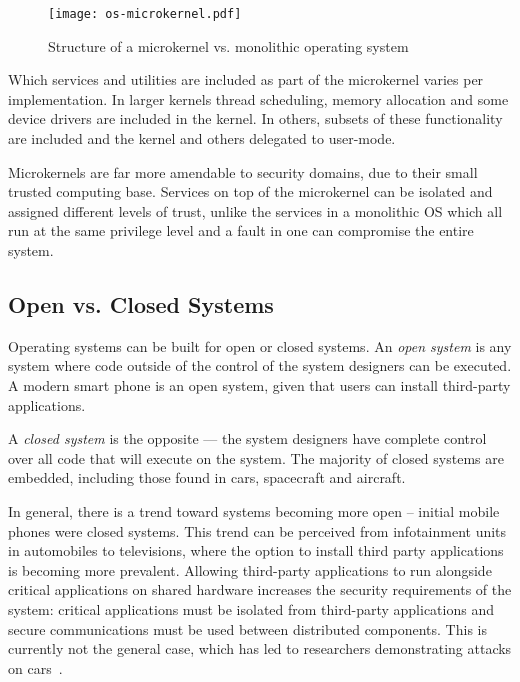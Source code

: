 \begin{figure}[tb]
	\begin{center}
		\leavevmode
		\texttt{[image: os-microkernel.pdf]}
		\caption{Structure of a microkernel vs. monolithic operating system}
		\label{fig:os-microkernel}
	\end{center}
\end{figure}

Which services and utilities are included as part of the microkernel varies per implementation. In
larger kernels thread scheduling, memory allocation and some device drivers are included in the kernel.
In others, subsets of these functionality are included and the kernel and others delegated to
user-mode. 

Microkernels are far more amendable to security domains, due to their small trusted computing base.
Services on top of the microkernel can be isolated and assigned different levels of trust, unlike
the services in a monolithic \gls{OS} which all run at the same privilege level and a fault in one
can compromise the entire system. 

\subsection{Open vs. Closed Systems}

Operating systems can be built for open or closed systems.
An \emph{open system} is any system where code outside of the control of the system designers can be executed.
A modern smart phone is an open system, given that users can install third-party applications.

A \emph{closed system} is the opposite --- the system designers have complete control over all code that will execute on the system.
The majority of closed systems are embedded, including those found in cars, spacecraft and aircraft.

In general, there is a trend toward systems becoming more open -- initial mobile phones were closed systems.
This trend can be perceived from infotainment units in automobiles to televisions, where the option to install third party applications is becoming more prevalent.
Allowing third-party applications to run alongside critical applications on shared hardware increases the security requirements of the system: critical applications must be isolated from third-party applications and secure communications must be used between distributed components.
This is currently not the general case, which has led to researchers demonstrating attacks on cars~\citep{Checkoway_MKASSKCRK_11}.

